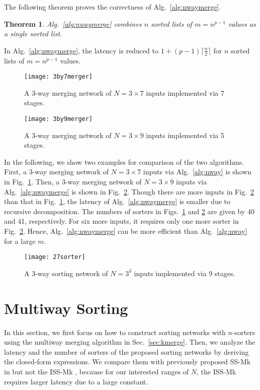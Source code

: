 \documentclass[10pt,journal,cspaper,compsoc]{IEEEtran}
\newtheorem{thm}{Theorem}[section]
\begin{document}
The following theorem proves the correctness of Alg.~\ref{alg:nwaymerge}.
\begin{thm}
  Alg.~\ref{alg:nwaymerge} combines $n$ sorted lists of $m=n^{p-1}$ values as a single sorted list.
  \label{thm:nwaymerge}
\end{thm}
In Alg.~\ref{alg:nwaymerge}, the latency is reduced to $1+(p-1)\lceil \frac{n}{2}\rceil$ for $n$ sorted lists of $m=n^{p-1}$ values.

\begin{figure}[!t]
\centering
\texttt{[image: 3by7merger]}
\caption{A 3-way merging network of $N=3\times 7$ inputs implemented via 7 stages.}
\label{fig:3by7merger}
\end{figure}

\begin{figure}[!t]
\centering
\texttt{[image: 3by9merger]}
\caption{A 3-way merging network of $N=3\times 9$ inputs implemented via 5 stages.}
\label{fig:3by9merger}
\end{figure}

In the following, we show two examples for comparison of the two algorithms.
First, a 3-way merging network of $N=3\times 7$ inputs via Alg.~\ref{alg:nway} is shown in Fig.~\ref{fig:3by7merger}.
Then, a 3-way merging network of $N=3\times 9$ inputs via Alg.~\ref{alg:nwaymerge} is shown in Fig.~\ref{fig:3by9merger}. Though there are more inputs in Fig.~\ref{fig:3by9merger} than that in Fig.~\ref{fig:3by7merger}, the latency of Alg.~\ref{alg:nwaymerge} is smaller due to recursive decomposition. The numbers of sorters in Figs.~\ref{fig:3by7merger} and \ref{fig:3by9merger} are given by 40 and 41, respectively. For six more inputs, it requires only one more sorter in Fig.~\ref{fig:3by9merger}. Hence, Alg.~\ref{alg:nwaymerge} can be more efficient than Alg.~\ref{alg:nway} for a large $m$.

\begin{figure}[!t]
\centering
\texttt{[image: 27sorter]}
\caption{A 3-way sorting network of $N=3^3$ inputs implemented via 9 stages.}
\label{fig:27sorter}
\end{figure}

\section{Multiway Sorting}
\label{sec:ksort}
In this section, we first focus on how to construct sorting networks with $n$-sorters using the multiway merging algorithm in Sec.~\ref{sec:kmerge}. Then, we analyze the latency and the number of sorters of the proposed sorting networks by deriving the closed-form expressions. We compare them with previously proposed SS-Mk in \cite{gao1997sloping} but not the ISS-Mk \cite{zhao1998efficient}, because for our interested ranges of $N$, the ISS-Mk requires larger latency due to a large constant.
\end{document}
